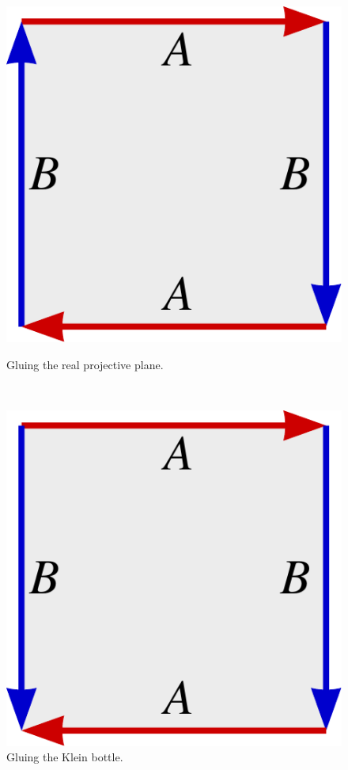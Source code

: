 \begin{figure}
\centering
\begin{minipage}{.45\textwidth}
\begin{minipage}{.95\textwidth}
  \centering
  \includegraphics[width=0.5\linewidth]{images/fundamental-polygon-projective}
  \caption{Gluing the real projective plane.}
  \label{fundamental-polygon-projective}
\end{minipage}\\
\begin{minipage}{.95\textwidth}
  \centering
  \includegraphics[width=0.5\linewidth]{images/fundamental-polygon-klein}
  \caption{Gluing the Klein bottle.}
  \label{fundamental-polygon-klein}
\end{minipage}


\end{minipage}
\end{figure}
